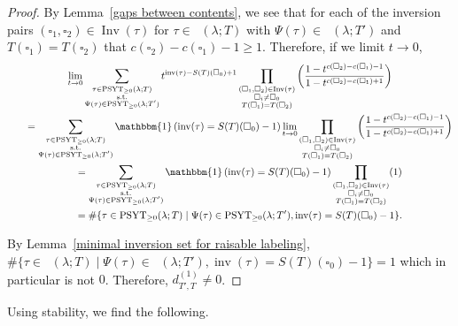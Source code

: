 \documentclass[pdftex]{sigma}
\numberwithin{equation}{section}
\theoremstyle{definition}
\DeclareMathOperator{\PSYT}{\mathrm{PSYT}_{\geq 0}}
\DeclareMathOperator{\Inv}{\mathrm{Inv}}
\DeclareMathOperator{\inv}{inv}
\begin{document}
\begin{proof}
By Lemma~\ref{gaps between contents}, we see that for each of the inversion pairs $(\square_1,\square_2) \in \Inv(\tau)$ for $\tau \in \PSYT(\lambda;T)$ with $\Psi(\tau) \in \PSYT(\lambda;T')$ and $T(\square_1) = T(\square_2)$ that $c(\square_2)-c(\square_1)-1 \geq 1$. Therefore, if we limit $t \rightarrow 0$,
\begin{gather*}
 \lim_{t \rightarrow 0} \sum_{\substack{\tau \in \PSYT(\lambda;T) \\ \text{s.t.}\\ \Psi(\tau) \in \PSYT(\lambda;T')}} t^{\inv(\tau) -S(T)(\square_0)+1} \prod_{\substack{(\square_1,\square_2) \in \Inv(\tau)\\ \square_i \neq \square_0 \\ T(\square_1)=T(\square_2)}} \left( \frac{1 - t^{c(\square_2)-c(\square_1)-1}}{1 -t^{c(\square_2)-c(\square_1)+1}} \right) \\
 \qquad = \sum_{\substack{\tau \in \PSYT(\lambda;T) \\ \text{s.t.}\\ \Psi(\tau) \in \PSYT(\lambda;T')}} \mathbbm{1}\left(\inv(\tau) = S(T)(\square_0)-1\right) \lim_{t \rightarrow 0} \prod_{\substack{(\square_1,\square_2) \in \Inv(\tau)\\ \square_i \neq \square_0 \\ T(\square_1)=T(\square_2)}} \left( \frac{1 - t^{c(\square_2)-c(\square_1)-1}}{1 -t^{c(\square_2)-c(\square_1)+1}} \right) \\
 \qquad = \sum_{\substack{\tau \in \PSYT(\lambda;T) \\ \text{s.t.}\\ \Psi(\tau) \in \PSYT(\lambda;T')}} \mathbbm{1}\left(\inv(\tau) = S(T)(\square_0)-1\right) \prod_{\substack{(\square_1,\square_2) \in \Inv(\tau)\\ \square_i \neq \square_0 \\ T(\square_1)=T(\square_2)}} (1) \\
 \qquad = \#\{ \tau \in \PSYT(\lambda;T) \mid \Psi(\tau) \in \PSYT(\lambda;T'), \inv(\tau)=S(T)(\square_0)-1\}.
\end{gather*}

By Lemma~\ref{minimal inversion set for raisable labeling}, $\#\{ \tau \in \PSYT(\lambda;T) \mid \Psi(\tau) \in \PSYT(\lambda;T'), \inv(\tau)=S(T)(\square_0)-1\} = 1$ which in particular is not $0$. Therefore, $d_{T',T}^{(1)} \neq 0$.
\end{proof}

Using stability, we find the following.
\end{document}
